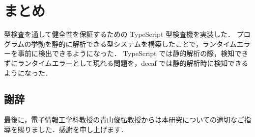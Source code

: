 \chapter{まとめ}

型検査を通して健全性を保証するための TypeScript 型検査機を実装した．
プログラムの挙動を静的に解析できる型システムを構築したことで，ランタイムエラーを事前に検出できるようになった．
TypeScript では静的解析の際，検知できずにランタイムエラーとして現れる問題を，decaf では静的解析時に検知できるようになった．

\section{謝辞}

最後に，電子情報工学科教授の青山俊弘教授からは本研究についての適切なご指導を賜りました．感謝を申し上げます．
